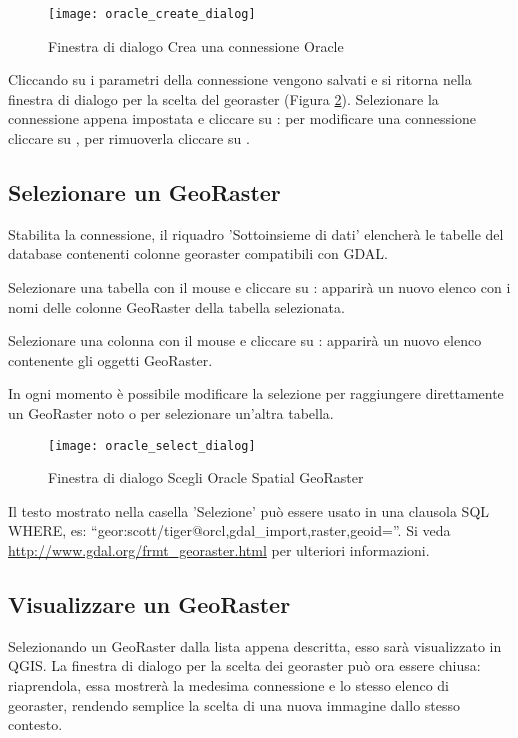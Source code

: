 \begin{figure}[ht]
   \centering
   \texttt{[image: oracle\_create\_dialog]}   
   \caption{Finestra di dialogo Crea una connessione Oracle \nixcaption}\label{fig:oracle_create}
\end{figure}

Cliccando su  i parametri della connessione vengono salvati e si ritorna nella finestra di dialogo 
per la scelta del georaster (Figura \ref{fig:oracle_select}). Selezionare la connessione appena 
impostata e cliccare su : per modificare una connessione cliccare su , per 
rimuoverla cliccare su .

\subsection{Selezionare un GeoRaster}

Stabilita la connessione, il riquadro 'Sottoinsieme di dati' elencherà le tabelle del database contenenti 
colonne georaster compatibili con GDAL.

Selezionare una tabella con il mouse e cliccare su : apparirà un nuovo elenco con i nomi delle 
colonne GeoRaster della tabella selezionata.

Selezionare una colonna con il mouse e cliccare su : apparirà un nuovo elenco contenente 
gli oggetti GeoRaster.

In ogni momento è possibile modificare la selezione per raggiungere direttamente un GeoRaster noto o per 
selezionare un'altra tabella.

\begin{figure}[ht]
   \centering
   \texttt{[image: oracle\_select\_dialog]}   
   \caption{Finestra di dialogo Scegli Oracle Spatial GeoRaster \nixcaption}\label{fig:oracle_select}
\end{figure}

Il testo mostrato nella casella 'Selezione' può essere usato in una clausola SQL WHERE, es:
``geor:scott/tiger@orcl,gdal\_import,raster,geoid=''. Si veda \url{http://www.gdal.org/frmt_georaster.html} 
per ulteriori informazioni.

\subsection{Visualizzare un GeoRaster}

Selezionando un GeoRaster dalla lista appena descritta, esso sarà visualizzato in QGIS. La finestra di dialogo 
per la scelta dei georaster può ora essere chiusa: riaprendola, essa mostrerà la medesima connessione e 
lo stesso elenco di georaster, rendendo semplice la scelta di una nuova immagine dallo stesso contesto.

